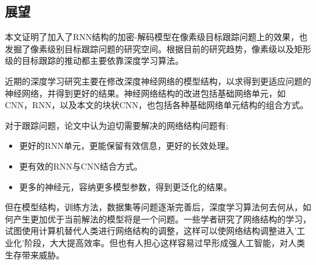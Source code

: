 \subsection{展望}
本文证明了加入了RNN结构的加密-解码模型在像素级目标跟踪问题上的效果，也发掘了像素级别目标跟踪问题的研究空间。根据目前的研究趋势，像素级以及矩形级的目标跟踪的推动都主要依靠深度学习算法。
\par
近期的深度学习研究主要在修改深度神经网络的模型结构，以求得到更适应问题的神经网络，并得到更好的结果。神经网络结构的改进包括基础网络单元，如CNN，RNN，以及本文的块状CNN，也包括各种基础网络单元结构的组合方式。
\par
对于跟踪问题，论文中认为迫切需要解决的网络结构问题有:
\begin{itemize}
    \item 更好的RNN单元，更能保留有效信息，更好的长效处理。
    \item 更有效的RNN与CNN结合方式。
    \item 更多的神经元，容纳更多模型参数，得到更泛化的结果。
\end{itemize}
\par
但在模型结构，训练方法，数据集等问题逐渐完善后，深度学习算法何去何从，如何产生更加优于当前解法的模型将是一个问题。一些学者研究了网络结构的学习\supercite{cortes2017adanet}，试图使用计算机替代人类进行网络结构的调整，这样可以使网络结构调整进入'工业化'阶段，大大提高效率。但也有人担心这样容易过早形成强人工智能\supercite{kurzweil2005singularity}，对人类生存带来威胁。

